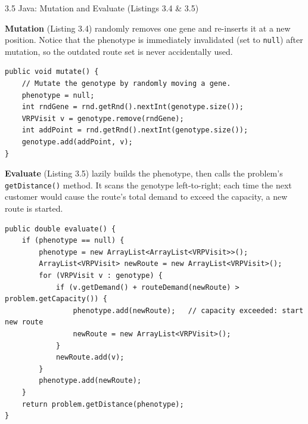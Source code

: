\documentclass[aspectratio=169,10pt]{beamer}
\begin{document}
\begin{frame}[fragile]{3.5 Java: Mutation and Evaluate (Listings 3.4 \& 3.5)}

  \textbf{Mutation} (Listing 3.4) randomly removes one gene and re-inserts it at a new position.
  Notice that the phenotype is immediately invalidated (set to \texttt{null}) after mutation,
  so the outdated route set is never accidentally used.

  \begin{lstlisting}[style=javastyle,caption={Listing 3.4 -- Individual.mutate()}]
public void mutate() {
    // Mutate the genotype by randomly moving a gene.
    phenotype = null;
    int rndGene = rnd.getRnd().nextInt(genotype.size());
    VRPVisit v = genotype.remove(rndGene);
    int addPoint = rnd.getRnd().nextInt(genotype.size());
    genotype.add(addPoint, v);
}
  \end{lstlisting}

  \textbf{Evaluate} (Listing 3.5) lazily builds the phenotype, then calls the problem's
  \texttt{getDistance()} method.
  It scans the genotype left-to-right; each time the next customer would cause the route's
  total demand to exceed the capacity, a new route is started.

  \begin{lstlisting}[style=javastyle,caption={Listing 3.5 -- Individual.evaluate()}]
public double evaluate() {
    if (phenotype == null) {
        phenotype = new ArrayList<ArrayList<VRPVisit>>();
        ArrayList<VRPVisit> newRoute = new ArrayList<VRPVisit>();
        for (VRPVisit v : genotype) {
            if (v.getDemand() + routeDemand(newRoute) > problem.getCapacity()) {
                phenotype.add(newRoute);   // capacity exceeded: start new route
                newRoute = new ArrayList<VRPVisit>();
            }
            newRoute.add(v);
        }
        phenotype.add(newRoute);
    }
    return problem.getDistance(phenotype);
}
  \end{lstlisting}

\end{frame}
\end{document}

